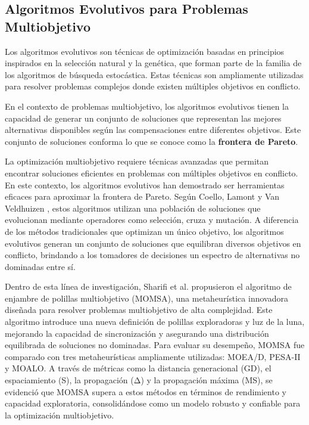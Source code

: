 \documentclass[12pt]{article}
\begin{document}
\subsection{Algoritmos Evolutivos para Problemas Multiobjetivo}

Los algoritmos evolutivos son técnicas de optimización basadas en principios inspirados en la selección natural y la genética, que forman parte de la familia de los algoritmos de búsqueda estocástica. Estas técnicas son ampliamente utilizadas para resolver problemas complejos donde existen múltiples objetivos en conflicto. 

En el contexto de problemas multiobjetivo, los algoritmos evolutivos tienen la capacidad de generar un conjunto de soluciones que representan las mejores alternativas disponibles según las compensaciones entre diferentes objetivos. Este conjunto de soluciones conforma lo que se conoce como la \textbf{frontera de Pareto}.

La optimización multiobjetivo requiere técnicas avanzadas que permitan encontrar soluciones eficientes en problemas con múltiples objetivos en conflicto. En este contexto, los algoritmos evolutivos han demostrado ser herramientas eficaces para aproximar la frontera de Pareto. Según Coello, Lamont y Van Veldhuizen \cite{Coello2007}, estos algoritmos utilizan una población de soluciones que evolucionan mediante operadores como selección, cruza y mutación. A diferencia de los métodos tradicionales que optimizan un único objetivo, los algoritmos evolutivos generan un conjunto de soluciones que equilibran diversos objetivos en conflicto, brindando a los tomadores de decisiones un espectro de alternativas no dominadas entre sí.  

Dentro de esta línea de investigación, Sharifi et al. \cite{Sharifi2021} propusieron el algoritmo de enjambre de polillas multiobjetivo (MOMSA), una metaheurística innovadora diseñada para resolver problemas multiobjetivo de alta complejidad. Este algoritmo introduce una nueva definición de polillas exploradoras y luz de la luna, mejorando la capacidad de sincronización y asegurando una distribución equilibrada de soluciones no dominadas. Para evaluar su desempeño, MOMSA fue comparado con tres metaheurísticas ampliamente utilizadas: MOEA/D, PESA-II y MOALO. A través de métricas como la distancia generacional (GD), el espaciamiento (S), la propagación (Δ) y la propagación máxima (MS), se evidenció que MOMSA supera a estos métodos en términos de rendimiento y capacidad exploratoria, consolidándose como un modelo robusto y confiable para la optimización multiobjetivo.
\end{document}
